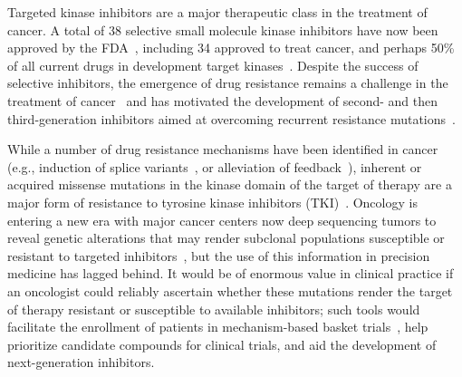 \documentclass[phd,tocprelim]{cornell}
\begin{document}
Targeted kinase inhibitors are a major therapeutic class in the treatment of cancer.
A total of 38 selective small molecule kinase inhibitors have now been approved by the FDA~\citep{fda-approved-kinase-inhibitors}, including 34 approved to treat cancer, and perhaps 50\% of all current drugs in development target kinases~\citep{Santos:Nat.Rev.DrugDiscov.:2016}.
Despite the success of selective inhibitors, the emergence of drug resistance remains a challenge in the treatment of cancer~\citep{Shah:CancerCell:2002,BUCZEK201431,huang2015mechanisms,Meyer2051,Davare29092015,VanAllen94,Rani3821,Holohan:Nat.Rev.Cancer:2013} and has motivated the development of second- and then third-generation inhibitors aimed at overcoming recurrent resistance mutations~\citep{Weisberg:Nat.Rev.Cancer:2007,Y.Lu:Curr.Med.Chem.:2011,Juchum:DrugResist.Updat.:2015,Song:ActaPharm.Sin.B:2015,Neel:NpjPrecis.Oncol.:2017}.   

While a number of drug resistance mechanisms have been identified in cancer (e.g., induction of splice variants~\citep{Gruber2006}, or alleviation of feedback~\citep{Chandarlapaty:CancerCell:2011}), inherent or acquired missense mutations in the kinase domain of the target of therapy are a major form of resistance to tyrosine kinase inhibitors (TKI)~\citep{Knight:Nat.Rev.Cancer:2010,Holohan:Nat.Rev.Cancer:2013,Housman:Cancers:2014}.
Oncology is entering a new era with major cancer centers now deep sequencing tumors to reveal genetic alterations that may render subclonal populations susceptible or resistant to targeted inhibitors~\citep{Zehir:Nat.Med.:2017}, but the use of this information in precision medicine has lagged behind. 
It would be of enormous value in clinical practice if an oncologist could reliably ascertain whether these mutations render the target of therapy resistant or susceptible to available inhibitors; such tools would facilitate the enrollment of patients in mechanism-based basket trials~\citep{Redig::2015,Hyman:Cell:2017}, help prioritize candidate compounds for clinical trials, and aid the development of next-generation inhibitors. 
\end{document}
